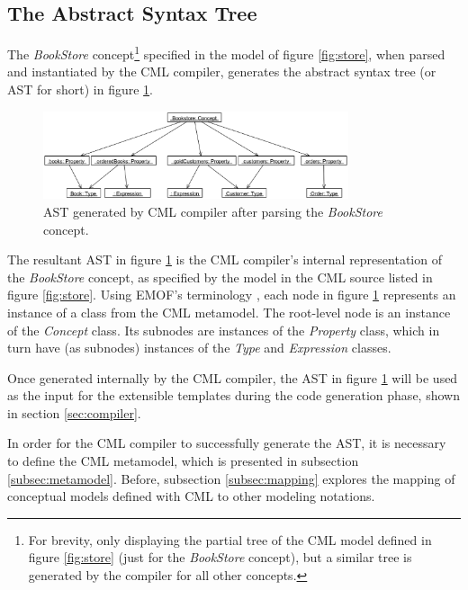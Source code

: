 \subsection{The Abstract Syntax Tree}\label{subsec:ast}

The \emph{BookStore} concept\footnote{For brevity,
only displaying the partial tree of the CML model defined in figure \ref{fig:store} (just for the \emph{BookStore} concept), 
but a similar tree is generated by the compiler for all other concepts.}
specified in the model of figure \ref{fig:store},
when parsed and instantiated by the CML compiler,
generates the abstract syntax tree (or AST for short) in figure \ref{fig:ast}.

\begin{figure}
\centering
\includegraphics[width=0.8\textwidth]{language/figure-ast}
\caption{AST generated by CML compiler after parsing the \emph{BookStore} concept.}
\label{fig:ast}
\end{figure}

The resultant AST in figure \ref{fig:ast} is the CML compiler's internal representation of the \emph{BookStore} concept,
as specified by the model in the CML source listed in figure \ref{fig:store}. 
Using EMOF's terminology \cite{mof},
each node in figure \ref{fig:ast} represents an instance of a class from the CML metamodel.
The root-level node is an instance of the \emph{Concept} class. 
Its subnodes are instances of the \emph{Property} class,
which in turn have (as subnodes) instances of the \emph{Type} and \emph{Expression} classes.

Once generated internally by the CML compiler,
the AST in figure \ref{fig:ast} will be used as the input for the extensible templates during the code generation phase,
shown in section \ref{sec:compiler}.

In order for the CML compiler to successfully generate the AST,
it is necessary to define the CML metamodel,
which is presented in subsection \ref{subsec:metamodel}.
Before, subsection \ref{subsec:mapping} explores the mapping of conceptual models defined with CML to other modeling notations.

